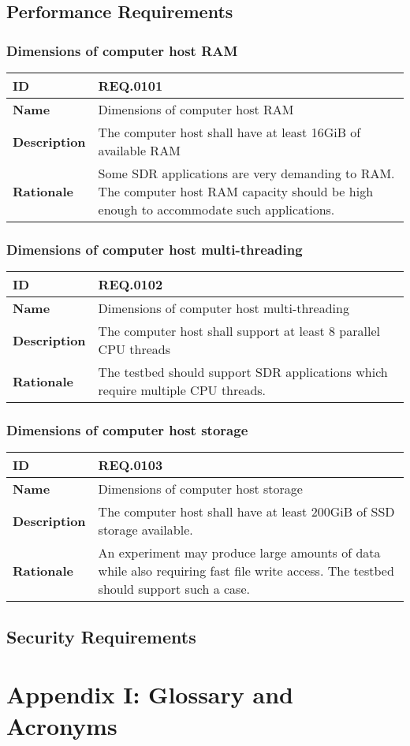 \documentclass[english,titlepage,a4paper]{report}
\newcommand{\requirement}[5]{
  \subsection{#2}
  #5

  \noindent
  \begin{tabular}{|l|p{9cm}|}
    \hline
    \textbf{ID} & #1 \\
    \hline
    \textbf{Name} & #2 \\
    \hline
    \textbf{Description} & #3 \\
    \hline
    \textbf{Rationale} & #4 \\
    \hline
  \end{tabular}
}
\begin{document}
\section{Performance Requirements}

\requirement{REQ.0101}{Dimensions of computer host RAM}{
  The computer host shall have at least 16GiB of available RAM
}{
  Some SDR applications are very demanding to RAM.
  The computer host RAM capacity should be high enough to accommodate such applications.
}{}
\requirement{REQ.0102}{Dimensions of computer host multi-threading}{
  The computer host shall support at least 8 parallel CPU threads
}{
  The testbed should support SDR applications which require multiple CPU threads.
}{}
\requirement{REQ.0103}{Dimensions of computer host storage}{
  The computer host shall have at least 200GiB of SSD storage available.
}{
  An experiment may produce large amounts of data while also requiring fast file write access.
  The testbed should support such a case.
}{}

\section{Security Requirements}


\chapter*{Appendix I: Glossary and Acronyms}

\printglossary
\printglossary[type=\acronymtype]
\end{document}
